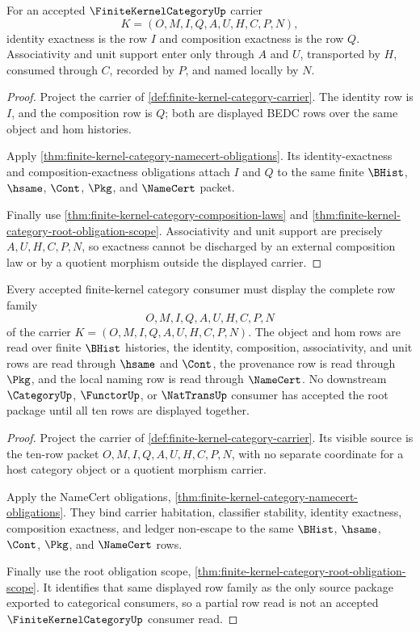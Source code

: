 \begin{theorem}
\label{thm:finite-kernel-category-identity-composition-exactness-scope}
For an accepted $\FiniteKernelCategoryUp$ carrier
$$
K=(O,M,I,Q,A,U,H,C,P,N),
$$
identity exactness is the row $I$ and composition exactness is the row $Q$.
Associativity and unit support enter only through $A$ and $U$, transported by
$H$, consumed through $C$, recorded by $P$, and named locally by $N$.
\end{theorem}
\begin{proof}
Project the carrier of \autoref{def:finite-kernel-category-carrier}. The
identity row is $I$, and the composition row is $Q$; both are displayed BEDC
rows over the same object and hom histories.

Apply \autoref{thm:finite-kernel-category-namecert-obligations}. Its
identity-exactness and composition-exactness obligations attach $I$ and $Q$
to the same finite $\BHist$, $\hsame$, $\Cont$, $\Pkg$, and $\NameCert$
packet.

Finally use \autoref{thm:finite-kernel-category-composition-laws} and
\autoref{thm:finite-kernel-category-root-obligation-scope}. Associativity and
unit support are precisely $A,U,H,C,P,N$, so exactness cannot be discharged by
an external composition law or by a quotient morphism outside the displayed
carrier.
\end{proof}

\begin{theorem}
\label{thm:finite-kernel-category-displayed-source-totality}
Every accepted finite-kernel category consumer must display the complete row
family
$$
O,M,I,Q,A,U,H,C,P,N
$$
of the carrier $K=(O,M,I,Q,A,U,H,C,P,N)$. The object and hom rows are read over
finite $\BHist$ histories, the identity, composition, associativity, and unit
rows are read through $\hsame$ and $\Cont$, the provenance row is read through
$\Pkg$, and the local naming row is read through $\NameCert$. No downstream
$\CategoryUp$, $\FunctorUp$, or $\NatTransUp$ consumer has accepted the root
package until all ten rows are displayed together.
\end{theorem}
\begin{proof}
Project the carrier of \autoref{def:finite-kernel-category-carrier}. Its
visible source is the ten-row packet $O,M,I,Q,A,U,H,C,P,N$, with no separate
coordinate for a host category object or a quotient morphism carrier.

Apply the NameCert obligations,
\autoref{thm:finite-kernel-category-namecert-obligations}. They bind carrier
habitation, classifier stability, identity exactness, composition exactness,
and ledger non-escape to the same $\BHist$, $\hsame$, $\Cont$, $\Pkg$, and
$\NameCert$ rows.

Finally use the root obligation scope,
\autoref{thm:finite-kernel-category-root-obligation-scope}. It identifies that
same displayed row family as the only source package exported to categorical
consumers, so a partial row read is not an accepted $\FiniteKernelCategoryUp$
consumer read.
\end{proof}

